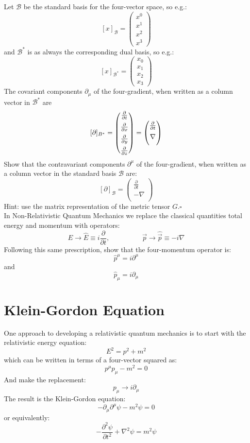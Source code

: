 \documentclass[12pt]{article}
\begin{document}
\exercise Let $\mathcal{B}$ be the standard basis for the four-vector space, so e.g.:
$$[x]_\mathcal{B} = \begin{pmatrix} x^0 \\ x^1 \\ x^2 \\ x^3 \end{pmatrix} $$
and $\mathcal{B}^*$ is as always the corresponding dual basis, so e.g.:
$$[x]_{\mathcal{B}^*} = \begin{pmatrix} x_0 \\ x_1 \\ x_2 \\ x_3 \end{pmatrix} $$
The covariant components $\partial_\mu$ of the
four-gradient, when written as a column vector in $\mathcal{B}^*$ are
$$[\partial]_{\mathcal \mathcal{B}^*} =
\begin{pmatrix}  \frac{\partial}{\partial t} \\[5pt]
\frac{\partial}{\partial x} \\[5pt]
\frac{\partial}{\partial y} \\[5pt]
\frac{\partial}{\partial z} \\
\end{pmatrix}
=
\begin{pmatrix}  \frac{\partial}{\partial t} \\[5pt]
\nabla \\[5pt]
\end{pmatrix}
$$
Show that the contravariant components $\partial^\mu$ of the
four-gradient, when written as a column vector in the standard basis
$\mathcal{B}$ are:
$$
[\partial]_{\mathcal B} =
\begin{pmatrix}  \frac{\partial}{\partial t} \\[5pt]
-\nabla \\[5pt]
\end{pmatrix}
$$
Hint: use the matrix representation of the metric tensor $G$.$\square$\\[5pt]

\exercise In Non-Relativistic Quantum Mechanics we replace the classical quantities total energy and momentum with operators:
$$E \to \hat{E} \equiv i \frac{\partial}{\partial t}, \hspace{2cm}
\vec{p} \to \hat{\vec{p}} \equiv -i \nabla
$$
Following this same prescription, show that the four-momentum operator is:
$$\hat{p}^\mu = i \partial^\mu$$
and
$$\hat{p}_\mu = i \partial_\mu$$

\section{Klein-Gordon Equation}
One approach to developing a relativistic quantum mechanics is
to start with the relativistic energy equation:
$$E^2 = p^2 + m^2$$
which can be written in terms of a four-vector squared as:
$$p^\mu p_\mu - m^2 = 0$$
And make the replacement:
$$p_\mu \to i \partial_\mu$$
The result is the Klein-Gordon equation:
$$- \partial_\mu \partial^\mu \psi - m^2 \psi = 0$$
or equivalently:
$$-\frac{\partial^2 \psi}{\partial t^2} + \nabla^2 \psi = m^2 \psi$$
\end{document}
